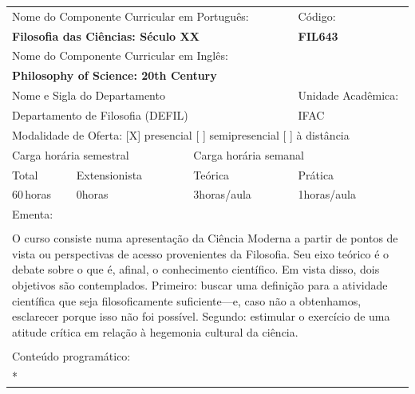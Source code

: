 \documentclass[11pt]{article}
\begin{document}
\begin{center}
\begin{longtable}{|p{4cm}|p{4cm}|p{4cm}|p{4cm}|}
\hline
\multicolumn{3}{|p{12cm}|}{Nome do Componente Curricular em Português:} &
\multicolumn{1}{p{4cm}|}{Código:} \\ 
\multicolumn{3}{|p{12cm}|}{\textbf{Filosofia das Ciências: Século XX}} &
\textbf{FIL643}\\ 
\multicolumn{3}{|p{12cm}|}{Nome do Componente Curricular em Inglês:} & \\ 
\multicolumn{3}{|p{12cm}|}{\textbf{Philosophy of Science: 20th Century}} & \\ 
\hline
\multicolumn{3}{|p{12cm}|}{Nome e Sigla do Departamento} & Unidade Acadêmica: \\ 
\multicolumn{3}{|p{12cm}|}{Departamento de Filosofia (DEFIL)} & {IFAC} \\ 
\hline
\multicolumn{4}{|p{16cm}|}{Modalidade de Oferta:
[X] presencial \hspace{0.6cm}
[ ] semipresencial \hspace{0.6cm}
[ ] à distância}\\
\hline
\multicolumn{2}{|p{8cm}|}{Carga horária semestral} &
\multicolumn{2}{p{8cm}|}{Carga horária semanal}\\
\hline
\multicolumn{1}{|p{4cm}|}{Total} &
\multicolumn{1}{p{4cm}|}{Extensionista} &
\multicolumn{1}{p{4cm}|}{Teórica} &
\multicolumn{1}{p{4cm}|}{Prática} \\ 
\multicolumn{1}{|p{4cm}|}{60\,horas} &
\multicolumn{1}{p{4cm}|}{0\;horas} &
\multicolumn{1}{p{4cm}|}{3\;horas/aula} &
\multicolumn{1}{p{4cm}|}{1\;horas/aula} \\ 
\hline
\multicolumn{4}{|p{16cm}|}{Ementa:}\\
\multicolumn{4}{|p{16cm}|}{}\\
\multicolumn{4}{|p{\dimexpr 16cm + 6\tabcolsep\relax}|}{O curso consiste numa apresentação da Ciência Moderna a partir de pontos de vista ou perspectivas de acesso provenientes da Filosofia. Seu eixo teórico é o debate sobre o que é, afinal, o conhecimento científico. Em vista disso, dois objetivos são contemplados. Primeiro: buscar uma definição para a atividade científica que seja filosoficamente suficiente—e, caso não a obtenhamos, esclarecer porque isso não foi possível. Segundo: estimular o exercício de uma atitude crítica em relação à hegemonia cultural da ciência.}\\
\multicolumn{4}{|p{16cm}|}{}\\
\hline
\multicolumn{4}{|p{16cm}|}{Conteúdo programático:}\\*

\end{longtable}
\end{center}
\end{document}
